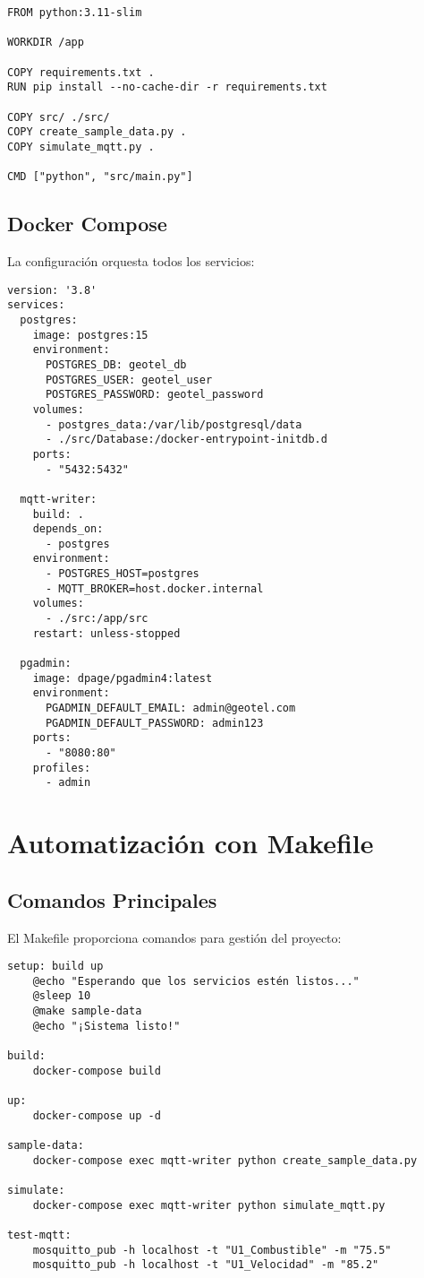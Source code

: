 \begin{verbatim}
FROM python:3.11-slim

WORKDIR /app

COPY requirements.txt .
RUN pip install --no-cache-dir -r requirements.txt

COPY src/ ./src/
COPY create_sample_data.py .
COPY simulate_mqtt.py .

CMD ["python", "src/main.py"]
\end{verbatim}

\subsection{Docker Compose}

La configuración orquesta todos los servicios:

\begin{verbatim}
version: '3.8'
services:
  postgres:
    image: postgres:15
    environment:
      POSTGRES_DB: geotel_db
      POSTGRES_USER: geotel_user
      POSTGRES_PASSWORD: geotel_password
    volumes:
      - postgres_data:/var/lib/postgresql/data
      - ./src/Database:/docker-entrypoint-initdb.d
    ports:
      - "5432:5432"

  mqtt-writer:
    build: .
    depends_on:
      - postgres
    environment:
      - POSTGRES_HOST=postgres
      - MQTT_BROKER=host.docker.internal
    volumes:
      - ./src:/app/src
    restart: unless-stopped

  pgadmin:
    image: dpage/pgadmin4:latest
    environment:
      PGADMIN_DEFAULT_EMAIL: admin@geotel.com
      PGADMIN_DEFAULT_PASSWORD: admin123
    ports:
      - "8080:80"
    profiles:
      - admin
\end{verbatim}

\section{Automatización con Makefile}

\subsection{Comandos Principales}

El Makefile proporciona comandos para gestión del proyecto:

\begin{verbatim}
setup: build up
	@echo "Esperando que los servicios estén listos..."
	@sleep 10
	@make sample-data
	@echo "¡Sistema listo!"

build:
	docker-compose build

up:
	docker-compose up -d

sample-data:
	docker-compose exec mqtt-writer python create_sample_data.py

simulate:
	docker-compose exec mqtt-writer python simulate_mqtt.py

test-mqtt:
	mosquitto_pub -h localhost -t "U1_Combustible" -m "75.5"
	mosquitto_pub -h localhost -t "U1_Velocidad" -m "85.2"
\end{verbatim}

